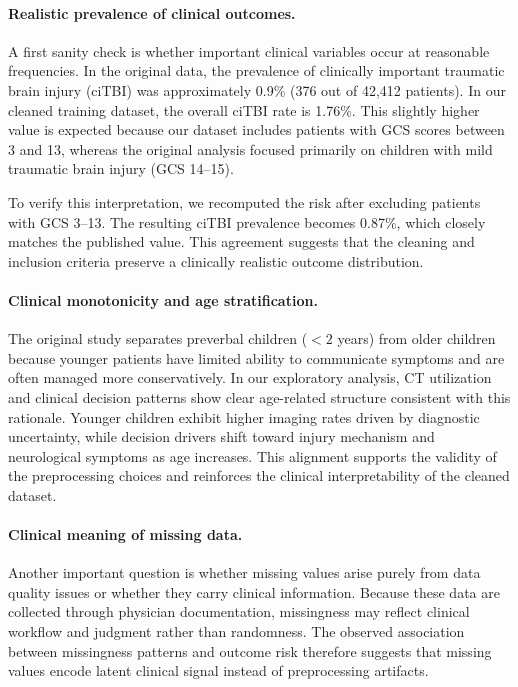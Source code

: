 \documentclass[10pt,letterpaper]{article}
\begin{document}
\paragraph{Realistic prevalence of clinical outcomes.}
A first sanity check is whether important clinical variables occur at
reasonable frequencies. In the original data, the prevalence of
clinically important traumatic brain injury (ciTBI) was approximately
0.9\% (376 out of 42,412 patients). In our cleaned training dataset, the
overall ciTBI rate is 1.76\%. This slightly higher value is expected because
our dataset includes patients with GCS scores between 3 and 13, whereas the
original analysis focused primarily on children with mild traumatic brain
injury (GCS 14--15). 

To verify this interpretation, we recomputed the risk after excluding
patients with GCS 3--13. The resulting ciTBI prevalence becomes 0.87\%,
which closely matches the published value. This agreement suggests that the
cleaning and inclusion criteria preserve a clinically realistic outcome
distribution.

\paragraph{Clinical monotonicity and age stratification.}
The original study separates preverbal children ($<2$ years) from older
children because younger patients have limited ability to communicate
symptoms and are often managed more conservatively. In our exploratory
analysis, CT utilization and clinical decision patterns show clear age-related
structure consistent with this rationale. Younger children exhibit higher
imaging rates driven by diagnostic uncertainty, while decision drivers shift
toward injury mechanism and neurological symptoms as age increases.
This alignment supports the validity of the preprocessing choices and
reinforces the clinical interpretability of the cleaned dataset.

\paragraph{Clinical meaning of missing data.}
Another important question is whether missing values arise purely from data
quality issues or whether they carry clinical information. Because these data
are collected through physician documentation, missingness may reflect
clinical workflow and judgment rather than randomness. The observed association between missingness patterns and outcome risk therefore suggests that missing values encode latent clinical signal instead of preprocessing artifacts.
\end{document}
